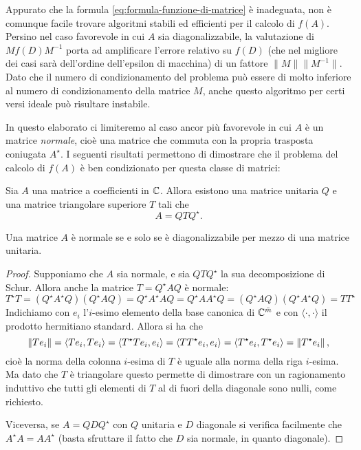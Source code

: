 Appurato che la formula \eqref{eq:formula-funzione-di-matrice} è inadeguata,
non è comunque facile trovare algoritmi stabili ed efficienti per il calcolo
di $f(A)$. Persino nel caso favorevole in cui $A$ sia diagonalizzabile,
la valutazione di $M f(D) M^{-1}$ porta ad amplificare l'errore relativo
su $f(D)$ (che nel migliore dei casi sarà dell'ordine dell'epsilon di macchina)
di un fattore $\lVert M \rVert \lVert M^{-1} \rVert$.
Dato che il numero di condizionamento del problema %
può essere di molto inferiore al numero di condizionamento della matrice $M$,
anche questo algoritmo per certi versi ideale può risultare instabile.

In questo elaborato ci limiteremo al caso ancor più favorevole in cui $A$
è un matrice \emph{normale}, cioè una matrice che commuta con la propria
trasposta coniugata $A^\star$.
I seguenti risultati permettono di dimostrare che il problema del
calcolo di $f(A)$ è ben condizionato per questa classe di matrici:

\begin{teor}
Sia $A$ una matrice a coefficienti in $\mathbb{C}$. Allora esistono una matrice
unitaria $Q$ e una matrice triangolare superiore $T$ tali che
\[
A = Q T Q^\star.
\]
\end{teor}

\begin{teor}
Una matrice $A$ è normale se e solo se è diagonalizzabile per mezzo
di una matrice unitaria.
\end{teor}

\begin{proof}
Supponiamo che $A$ sia normale, e sia $QTQ^\star$ la sua decomposizione di Schur.
Allora anche la matrice $T = Q^\star A Q$ è normale:
\[
T^\star T
= (Q^\star A^\star Q) (Q^\star A Q)
= Q^\star A^\star A Q
= Q^\star A A^\star Q
= (Q^\star A Q) (Q^\star A^\star Q)
= T T^\star
\]
Indichiamo con $e_i$ l'$i$-esimo elemento della base canonica di $\mathbb{C}^{\bar{m}}$
e con $\langle\cdot,\cdot\rangle$ il prodotto hermitiano standard.
Allora si ha che
\[
\left\lVert Te_i\right\rVert
= \langle T e_i, T e_i \rangle
= \langle T^\star T e_i, e_i \rangle
= \langle T T^\star e_i, e_i \rangle
= \langle T^\star e_i, T^\star e_i \rangle
= \left\lVert T^\star e_i\right\rVert,
\]
cioè la norma della colonna $i$-esima di $T$ è uguale alla norma della
riga $i$-esima. Ma dato che $T$ è triangolare questo permette di dimostrare
con un ragionamento induttivo che tutti gli elementi di $T$ al di fuori della
diagonale sono nulli, come richiesto.

Viceversa, se $A = Q D Q^\star$ con $Q$ unitaria e $D$ diagonale si verifica
facilmente che $A^\star A = A A^\star$ (basta sfruttare il fatto che
$D$ sia normale, in quanto diagonale).
\end{proof}

